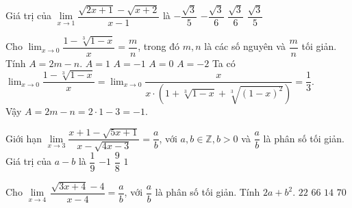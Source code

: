 \begin{ex}%
	Giá trị của $\lim\limits_{x \to 1} \dfrac{\sqrt {2x + 1}  - \sqrt {x + 2} }{x - 1}$  là 
	\choice
	{$- \dfrac{ \sqrt{3} }{5}$}
	{$-\dfrac{\sqrt{3} }{6}$}
	{\True $\dfrac{\sqrt{3}}{6}$}
	{$\dfrac{\sqrt{3}}{5}$}
\end{ex}

\begin{ex}%
	Cho $\displaystyle\lim_{x \to 0}\dfrac{1-\sqrt[3]{1-x}}{x}=\dfrac{m}{n}$, trong đó $m,n$ là các số nguyên và $\dfrac{m}{n}$ tối giản.\\ Tính $A=2m-n$.
	\choice
	{$A=1$}
	{\True $A=-1$}
	{$A=0$}
	{$A=-2$}
	\loigiai
	{Ta có $\displaystyle\lim_{x \to 0}\dfrac{1-\sqrt[3]{1-x}}{x}=\displaystyle\lim_{x \to 0}\dfrac{x}{x\cdot\left(1+\sqrt[3]{1-x}+\sqrt[3]{(1-x)^2}\right)}=\dfrac{1}{3}.$\\
		Vậy $A=2m-n=2\cdot1-3=-1.$}
\end{ex}
\begin{ex}%
	Giới hạn $\displaystyle\lim\limits_{x\to 3}\dfrac{x+1-\sqrt{5x+1}}{x-\sqrt{4x-3}}=\dfrac{a}{b}$, với $a,b\in\mathbb{Z},b>0$ và $\dfrac{a}{b}$ là phân số tối giản. Giá trị của $a-b$ là
	\choice
	{$\dfrac{1}{9}$}
	{$-1$}
	{$\dfrac{9}{8}$}
	{\True $1$}
\end{ex}
\begin{ex}%
	Cho $\underset{x\to 4}{\mathop{\lim}}\,\dfrac{\sqrt{3x+4}-4}{x-4}=\dfrac{a}{b}$, với $\dfrac{a}{b}$ là phân số tối giản. Tính $2a+b^2$.
	\choice
	{$22$}
	{$66$}
	{$14$}
	{\True $70$}
\end{ex}

